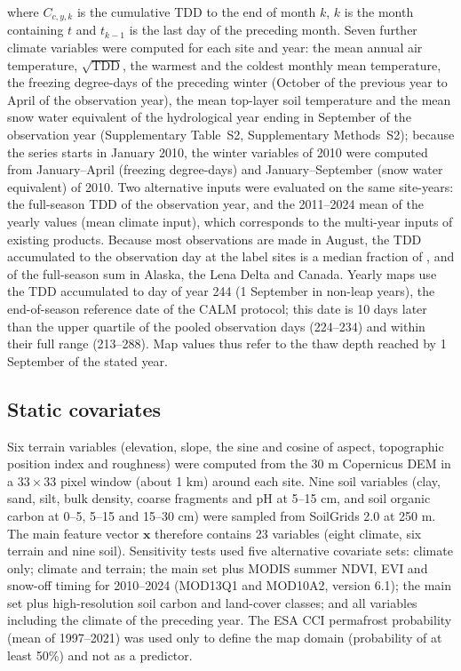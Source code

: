 where $C_{c,y,k}$ is the cumulative TDD to the end of month $k$, $k$ is the month containing $t$ and $t_{k-1}$ is the last day of the preceding month. Seven further climate variables were computed for each site and year: the mean annual air temperature, $\sqrt{\mathrm{TDD}}$, the warmest and the coldest monthly mean temperature, the freezing degree-days of the preceding winter (October of the previous year to April of the observation year), the mean top-layer soil temperature and the mean snow water equivalent of the hydrological year ending in September of the observation year (Supplementary Table~S2, Supplementary Methods~S2); because the series starts in January 2010, the winter variables of 2010 were computed from January--April (freezing degree-days) and January--September (snow water equivalent) of 2010. Two alternative inputs were evaluated on the same site-years: the full-season TDD of the observation year, and the 2011--2024 mean of the yearly values (mean climate input), which corresponds to the multi-year inputs of existing products. Because most observations are made in August, the TDD accumulated to the observation day at the label sites is a median fraction of \ntddfracAk, \ntddfracLe{} and \ntddfracCa{} of the full-season sum in Alaska, the Lena Delta and Canada. Yearly maps use the TDD accumulated to day of year 244 (1 September in non-leap years), the end-of-season reference date of the CALM protocol; this date is 10 days later than the upper quartile of the pooled observation days (224--234) and within their full range (213--288). Map values thus refer to the thaw depth reached by 1 September of the stated year.

\subsection{Static covariates}
Six terrain variables (elevation, slope, the sine and cosine of aspect, topographic position index and roughness) were computed from the 30 m Copernicus DEM\cite{CopDEM2021} in a $33\times33$ pixel window (about 1 km) around each site. Nine soil variables (clay, sand, silt, bulk density, coarse fragments and pH at 5--15 cm, and soil organic carbon at 0--5, 5--15 and 15--30 cm) were sampled from SoilGrids 2.0 at 250 m\cite{Poggio2021}. The main feature vector $\mathbf{x}$ therefore contains 23 variables (eight climate, six terrain and nine soil). Sensitivity tests used five alternative covariate sets: climate only; climate and terrain; the main set plus MODIS summer NDVI, EVI and snow-off timing for 2010--2024 (MOD13Q1 and MOD10A2, version 6.1)\cite{Didan2021,HallRiggs2021}; the main set plus high-resolution soil carbon and land-cover classes\cite{Palmtag2022}; and all variables including the climate of the preceding year. The ESA CCI permafrost probability (mean of 1997--2021)\cite{Westermann2024} was used only to define the map domain (probability of at least 50\%) and not as a predictor.

